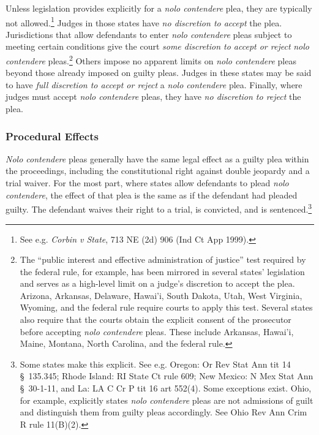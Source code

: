 Unless legislation provides explicitly for a \textit{nolo contendere} plea, they are typically not allowed.\footnote{See e.g. \textit{Corbin v State}, 713 NE (2d) 906 (Ind Ct App 1999).} Judges in those states have \textit{no discretion to accept} the plea. Jurisdictions that allow defendants to enter \textit{nolo contendere} pleas subject to meeting certain conditions give the court \textit{some discretion to accept or reject} \textit{nolo contendere} pleas.\footnote{The ``public interest and effective administration of justice” test required by the federal rule, for example, has been mirrored in several states' legislation and serves as a high-level limit on a judge's discretion to accept the plea. Arizona, Arkansas, Delaware, Hawai'i, South Dakota, Utah, West Virginia, Wyoming, and the federal rule require courts to apply this test. Several states also require that the courts obtain the explicit consent of the prosecutor before accepting \textit{nolo contendere} pleas. These include Arkansas, Hawai'i, Maine, Montana, North Carolina, and the federal rule.} Others impose no apparent limits on \textit{nolo contendere} pleas beyond those already imposed on guilty pleas. Judges in these states may be said to have \textit{full discretion to accept or reject} a \textit{nolo contendere} plea. Finally, where judges must accept \textit{nolo contendere} pleas, they have \textit{no discretion to reject} the plea.

\subsubsection{Procedural Effects}

\textit{Nolo contendere} pleas generally have the same legal effect as a guilty plea within the proceedings, including the constitutional right against double jeopardy and a trial waiver. For the most part, where states allow defendants to plead \textit{nolo contendere}, the effect of that plea is the same as if the defendant had pleaded guilty. The defendant waives their right to a trial, is convicted, and is sentenced.\footnote{Some states make this explicit. See e.g. Oregon: Or Rev Stat Ann tit 14 § 135.345; Rhode Island: RI State Ct rule 609; New Mexico: N Mex Stat Ann § 30-1-11, and La: LA C Cr P tit 16 art 552(4). Some exceptions exist. Ohio, for example, explicitly states \textit{nolo contendere} pleas are not admissions of guilt and distinguish them from guilty pleas accordingly. See Ohio Rev Ann Crim R rule 11(B)(2).}


